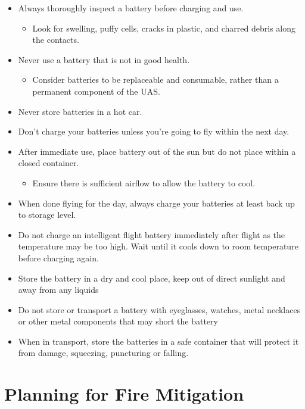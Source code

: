 \documentclass[
]{book}
\providecommand{\tightlist}{%
  \setlength{\itemsep}{0pt}\setlength{\parskip}{0pt}}
\begin{document}
\begin{itemize}
\item
  Always thoroughly inspect a battery before charging and use.

  \begin{itemize}
  \tightlist
  \item
    Look for swelling, puffy cells, cracks in plastic, and charred debris along the contacts.
  \end{itemize}
\item
  Never use a battery that is not in good health.

  \begin{itemize}
  \tightlist
  \item
    Consider batteries to be replaceable and consumable, rather than a permanent component of the UAS.
  \end{itemize}
\item
  Never store batteries in a hot car.
\item
  Don't charge your batteries unless you're going to fly within the next day.
\item
  After immediate use, place battery out of the sun but do not place within a closed container.

  \begin{itemize}
  \tightlist
  \item
    Ensure there is sufficient airflow to allow the battery to cool.
  \end{itemize}
\item
  When done flying for the day, always charge your batteries at least back up to storage level.
\item
  Do not charge an intelligent flight battery immediately after flight as the temperature may be too high. Wait until it cools down to room temperature before charging again.
\item
  Store the battery in a dry and cool place, keep out of direct sunlight and away from any liquids
\item
  Do not store or transport a battery with eyeglasses, watches, metal necklaces or other metal components that may short the battery
\item
  When in transport, store the batteries in a safe container that will protect it from damage, squeezing, puncturing or falling.
\end{itemize}

\hypertarget{planning-for-fire-mitigation}{%
\section{Planning for Fire Mitigation}\label{planning-for-fire-mitigation}}
\end{document}
